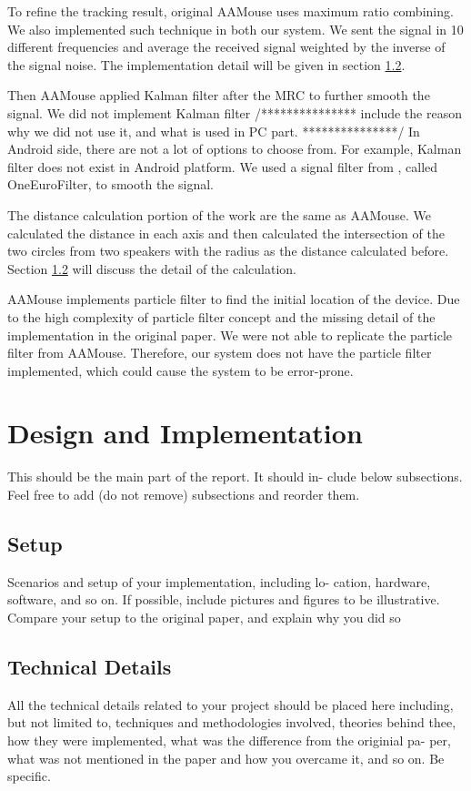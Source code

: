 \documentclass{acm_proc_article-sp}
\begin{document}
To refine the tracking result, original AAMouse uses maximum ratio combining. We also
implemented such technique in both our system. We sent the signal in 10 different
frequencies and average the received signal weighted by the inverse of the signal noise.
The implementation detail will be given in section \ref{technical_details}.

Then AAMouse applied Kalman filter after the MRC to further smooth the signal.
We did not implement Kalman filter 
/***************
include the reason why we did not use it, and what is used in PC part.
***************/
In Android side, there are not a lot of options to choose from. For example, 
Kalman filter does not exist in Android platform.
We used a signal
filter from \cite{SignalFilter}, called OneEuroFilter, to smooth the signal.

The distance calculation portion of the work are the same as AAMouse. We calculated the
distance in each axis and then calculated the intersection of the two circles from two
speakers with the radius as the distance calculated before. Section
\ref{technical_details} will discuss the detail of the calculation.

AAMouse implements particle filter to find the initial location of the device. Due to the 
high complexity of particle filter concept and the missing detail of the implementation
in the original paper. We were not able to replicate the particle filter from AAMouse.
Therefore, our system does not have the particle filter implemented, which could cause
the system to be error-prone.

\section{Design and Implementation} \label{design_and_implementation}
This should be the main part of the report.  It should in-
clude below subsections.  Feel free to add (do not remove)
subsections and reorder them.

\subsection{Setup}
Scenarios  and  setup  of  your  implementation,  including  lo-
cation,  hardware,  software,  and so on.  If possible,  include
pictures and figures to be illustrative.  Compare your setup
to the original paper, and explain why you did so

\subsection{Technical Details} \label{technical_details}
All  the  technical  details  related  to  your  project  should  be
placed  here  including,  but  not  limited  to,  techniques  and
methodologies involved, theories behind thee, how they were
implemented, what was the difference from the originial pa-
per,  what  was  not  mentioned  in  the  paper  and  how  you
overcame it, and so on.  Be specific.
\end{document}
